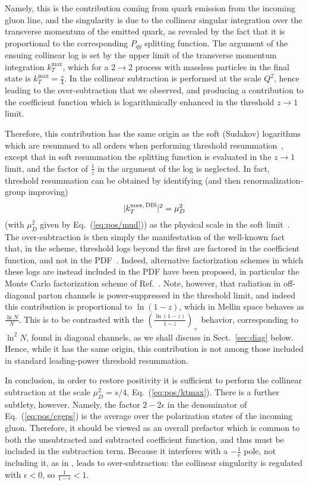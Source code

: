 Namely, this is the
contribution coming from quark emission from the incoming gluon line,
and the singularity is due to the collinear singular integration over
the transverse momentum of the emitted quark, as revealed by the fact
that it is proportional to the corresponding $P_{qg}$ splitting
function. The argument of the ensuing collinear log is set by the
upper limit of the transverse momentum integration $k_T^{\textrm{max}}$,
which for a $2\to2$ process with massless particles in the final state
is $k_T^{\textrm{max}}=\frac{s}{4}$. In \msbar{}
the collinear subtraction is performed at the scale $Q^2$,
hence leading to the over-subtraction that we observed, and producing
a contribution to the coefficient function which is logarithmically
enhanced in the threshold $z\to1$ limit.

Therefore, this contribution has the same origin as the soft (Sudakov)
logarithms 
which are resummed to all orders
when performing threshold
resummation~\cite{Catani:1989ne,Sterman:1986aj}, except that 
in soft resummation the splitting function is evaluated in the $z\to1$
limit, and the factor of $\frac{1}{z}$ in the argument of the log is
neglected.
In fact, threshold resummation can be
obtained by identifying (and then
renormalization-group improving)
\begin{equation}\label{eq:pos/ktmax}
 |k_T^{\textrm{max,\,DIS}}|^2=\mu_D^2
\end{equation}
(with $\mu_D^2$ given by Eq.~(\ref{eq:pos/mud}))
  as the physical
scale in the soft limit~\cite{Forte:2002ni}. The over-subtraction is then
simply the manifestation of the well-known fact that, in the \msbar{} scheme,
threshold logs beyond the first are factored in the coefficient
function, and not in the PDF~\cite{Albino:2000cp}. Indeed, alternative
factorization schemes in which these logs are instead included in the
PDF have been proposed, in particular  the Monte Carlo
factorization scheme of Ref.~\cite{Jadach:2016acv}. Note, however, that
radiation in off-diagonal parton channels is power-suppressed in the
threshold limit, and indeed this contribution is proportional to
$\ln(1-z)$, which in Mellin space behaves as $\frac{\ln N}{N}$. This is to be
contrasted with the $\left(\frac{\ln(1-z)}{1-z}\right)_+$ behavior, corresponding to 
$\ln^2 N$, found in diagonal channels, as we shall discuss in
Sect.~\ref{sec:diag} below. Hence, while it has the same origin, this
contribution is not among those included in standard leading-power
threshold resummation. 

In conclusion,  in order to
restore positivity it is  sufficient to perform the collinear
subtraction at the scale $\mu_D^2=s/4$, Eq.~(\ref{eq:pos/ktmax}).
There is a further subtlety, however. Namely, the factor $2-2\epsilon$
in the denominator of Eq.~(\ref{eq:pos/cgeps}) is the average over the
polarization states of the incoming gluon. Therefore, it should be
viewed as an overall prefactor which is common to both the
unsubtracted and subtracted coefficient function, and thus  must be
included in the subtraction term. Because it interferes with a
$-\frac{1}{\epsilon}$ pole, not including it, as in \msbar{}, leads to
over-subtraction: 
the collinear singularity is regulated with
$\epsilon<0$, so $\frac{1}{1-\epsilon}<1$.  

